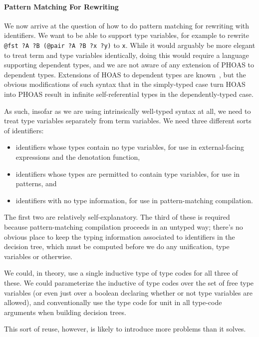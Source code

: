 \paragraph{Pattern Matching For Rewriting}
We now arrive at the question of how to do pattern matching for rewriting with identifiers.
We want to be able to support type variables, for example to rewrite \texttt{@fst ?A ?B (@pair ?A ?B ?x ?y)} to \texttt{x}.
While it would arguably be more elegant to treat term and type variables identically, doing this would require a language supporting dependent types, and we are not aware of any extension of PHOAS to dependent types.
Extensions of HOAS to dependent types are known~\cite{Outrageous2010McBride}, but the obvious modifications of such syntax that in the simply-typed case turn HOAS into PHOAS result in infinite self-referential types in the dependently-typed case.

As such, insofar as we are using intrinsically well-typed syntax at all, we need to treat type variables separately from term variables.
We need three different sorts of identifiers:
\begin{itemize}
\item
  identifiers whose types contain no type variables, for use in external-facing expressions and the denotation function,
\item
  identifiers whose types are permitted to contain type variables, for use in patterns, and
\item
  identifiers with no type information, for use in pattern-matching compilation.
\end{itemize}
The first two are relatively self-explanatory.
The third of these is required because pattern-matching compilation proceeds in an untyped way; there's no obvious place to keep the typing information associated to identifiers in the decision tree, which must be computed before we do any unification, type variables or otherwise.

We could, in theory, use a single inductive type of type codes for all three of these.
We could parameterize the inductive of type codes over the set of free type variables (or even just over a boolean declaring whether or not type variables are allowed), and conventionally use the type code for unit in all type-code arguments when building decision trees.

This sort of reuse, however, is likely to introduce more problems than it solves.

